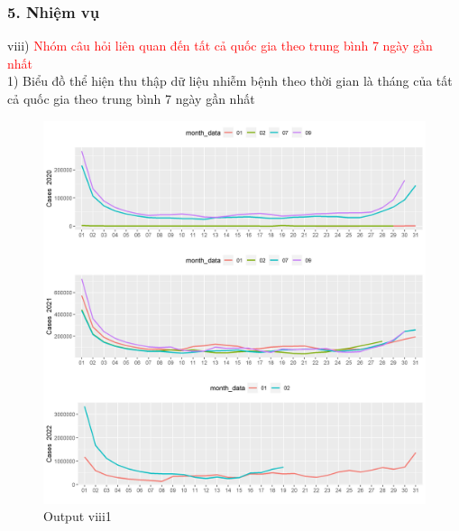 \documentclass[english,10pt,table]{beamer}
\begin{document}
\begin{frame}[fragile]
\frametitle{5.  Nhiệm vụ}
viii) \textcolor{red}{Nhóm câu hỏi liên quan đến tất cả quốc gia theo trung bình 7 ngày gần nhất}\\
    1) Biểu đồ thể hiện thu thập dữ liệu nhiễm bệnh theo thời gian là tháng của tất cả quốc gia theo trung bình 7 ngày gần nhất
			\begin{figure}[h!]
	\begin{center}
		    \includegraphics[scale = 0.28]{Images/VIII/viii1 World .jpeg}
		     \caption{Output viii1}
		\end{center}
		\end{figure}
\end{frame}
\end{document}
